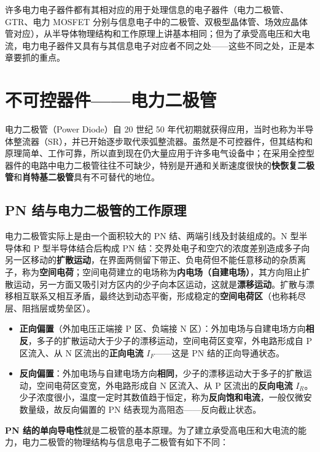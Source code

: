 许多电力电子器件都有其相对应的用于处理信息的电子器件（电力二极管、GTR、电力 MOSFET 分别与信息电子中的二极管、双极型晶体管、场效应晶体管对应），从半导体物理结构和工作原理上讲基本相同；但为了承受高电压和大电流，电力电子器件又具有与其信息电子对应者不同之处——这些不同之处，正是本章要抓的重点。

\section{不可控器件——电力二极管}

电力二极管（Power Diode）自 20 世纪 50 年代初期就获得应用，当时也称为半导体整流器（SR），并已开始逐步取代汞弧整流器。虽然是不可控器件，但其结构和原理简单、工作可靠，所以直到现在仍大量应用于许多电气设备中；在采用全控型器件的电路中电力二极管往往不可缺少，特别是开通和关断速度很快的\textbf{快恢复二极管}和\textbf{肖特基二极管}具有不可替代的地位。

\subsection{PN 结与电力二极管的工作原理}

电力二极管实际上是由一个面积较大的 PN 结、两端引线及封装组成的。N 型半导体和 P 型半导体结合后构成 PN 结：交界处电子和空穴的浓度差别造成多子向另一区移动的\textbf{扩散运动}，在界面两侧留下带正、负电荷但不能任意移动的杂质离子，称为\textbf{空间电荷}；空间电荷建立的电场称为\textbf{内电场（自建电场）}，其方向阻止扩散运动，另一方面又吸引对方区内的少子向本区运动，这就是\textbf{漂移运动}。扩散与漂移相互联系又相互矛盾，最终达到动态平衡，形成稳定的\textbf{空间电荷区}（也称耗尽层、阻挡层或势垒区）。

\begin{itemize}
  \item \textbf{正向偏置}（外加电压正端接 P 区、负端接 N 区）：外加电场与自建电场方向\textbf{相反}，多子的扩散运动大于少子的漂移运动，空间电荷区变窄，外电路形成自 P 区流入、从 N 区流出的\textbf{正向电流} $I_F$——这是 PN 结的正向导通状态。
  \item \textbf{反向偏置}：外加电场与自建电场方向\textbf{相同}，少子的漂移运动大于多子的扩散运动，空间电荷区变宽，外电路形成自 N 区流入、从 P 区流出的\textbf{反向电流} $I_R$。少子浓度很小，温度一定时其数值趋于恒定，称为\textbf{反向饱和电流}，一般仅微安数量级，故反向偏置的 PN 结表现为高阻态——反向截止状态。
\end{itemize}

\textbf{PN 结的单向导电性}就是二极管的基本原理。为了建立承受高电压和大电流的能力，电力二极管的物理结构与信息电子二极管有如下不同：

